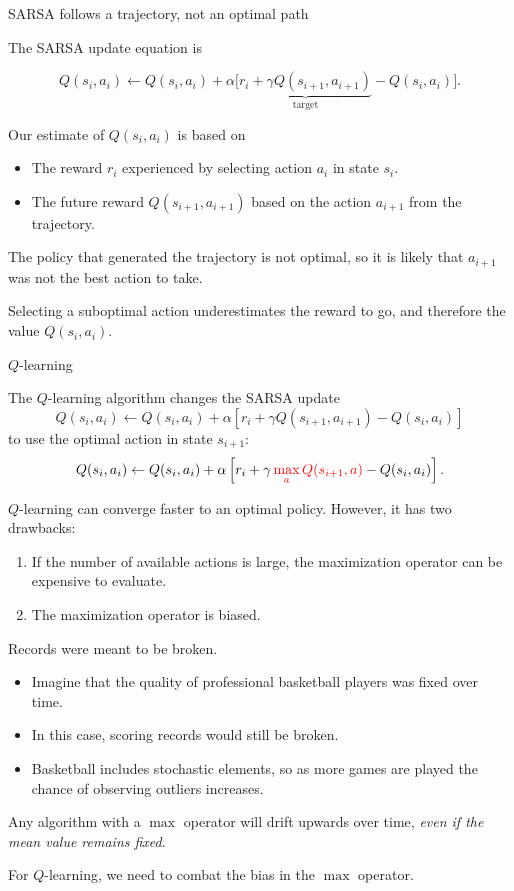 \documentclass[9pt]{beamer}
\newcommand\pskip{\pause\bigskip}
\newcommand\lspace{\addtolength{\itemsep}{0.5\baselineskip}}
\newcommand\red[1]{{\color{red}#1}}
\begin{document}
\begin{frame}{SARSA follows a trajectory, not an optimal path}

The SARSA update equation is

\[ Q(s_i,a_i) \leftarrow Q(s_i,a_i) + \alpha\bigg[ \underbrace{r_i + \gamma Q(s_{i+1},a_{i+1})}_\text{target} - Q(s_i,a_i) \bigg]. \]

\pskip
Our estimate of $Q(s_i,a_i)$ is based on
\begin{itemize}
	\item The reward $r_i$ experienced by selecting action $a_i$ in state $s_i$.
	\item The future reward $Q(s_{i+1},a_{i+1})$ based on the action $a_{i+1}$ from the trajectory.
\end{itemize}

\pskip
The policy that generated the trajectory is not optimal, so it is likely that $a_{i+1}$ was not the best action to take.

\bigskip
Selecting a suboptimal action underestimates the reward to go, and therefore the value $Q(s_i,a_i)$.

\end{frame}

\begin{frame}{$Q$-learning}

The $Q$-learning algorithm changes the SARSA update
\[ Q(s_i,a_i) \leftarrow Q(s_i,a_i) + \alpha\left[ r_i + \gamma Q(s_{i+1},a_{i+1}) - Q(s_i,a_i) \right] \]
to use the optimal action in state $s_{i+1}$:
\[ Q(s_i,a_i) \leftarrow Q(s_i,a_i) + \alpha\left[ r_i + \gamma\, \red{\max_a Q(s_{i+1},a)} - Q(s_i,a_i) \right]. \]
	
\pskip
$Q$-learning can converge faster to an optimal policy. However, it has two drawbacks:
\begin{enumerate}
	\item If the number of available actions is large, the maximization operator can be expensive to evaluate.
	\item The maximization operator is biased.
\end{enumerate}
\end{frame}

\begin{frame}{Records were meant to be broken.}

\begin{itemize}\lspace
	\item Imagine that the quality of professional basketball players was fixed over time.
	\item In this case, scoring records would still be broken.
	\item Basketball includes stochastic elements, so as more games are played the chance of observing outliers increases.
\end{itemize}

\pskip
Any algorithm with a $\max$ operator will drift upwards over time, \emph{even if the mean value remains fixed}.

\bigskip
For $Q$-learning, we need to combat the bias in the $\max$ operator.
	
\end{frame}
\end{document}

